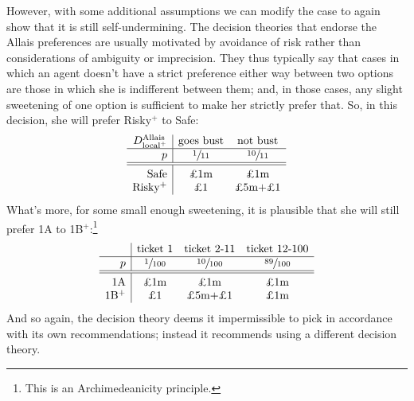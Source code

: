 \documentclass[a4paper]{article}
\newcommand\Tstrut{\rule{0pt}{2.6ex}}       %
\newcommand\Bstrut{\rule[-0.9ex]{0pt}{0pt}} %
\newenvironment{CCM rewritten}
{\begingroup\color{blue}} %
{\endgroup}              %
\begin{document}

However, with some additional assumptions we can modify the case to again show that it is still self-undermining. 
The decision theories that endorse the Allais preferences are usually motivated by avoidance of risk rather than considerations of ambiguity or imprecision. They thus typically say that cases in which an agent doesn't have a strict preference either way between two options are those in which  she is indifferent between them; and, in those cases, any slight sweetening of one option is sufficient to make her strictly prefer  that. %
So, in this decision, she will prefer Risky$^+$ to Safe:
$$
\begin{array}{r|cc}
 D^{\mathrm{Allais}}_{\mathrm{local}^+} & \text{goes bust} &  \text{not bust}  \Bstrut\\\hline
	p & \sfrac{1}{11} & \sfrac{10}{11}\Bstrut\\\hline\hline\Tstrut
	\text{Safe} &\text{\pounds 1m}&\text{\pounds 1m}                      \\
	\text{Risky$^+$} & \text{\pounds 1}&\text{\pounds 5m+\pounds 1}
\end{array}
$$ What's more, for some small enough sweetening, it is plausible that she will still prefer 1A to 1B$^+$:\footnote{This is an Archimedeanicity principle.}
$$
\begin{array}{r|cccc}
	& \text{ticket 1} &\text{ticket 2-11}& \text{ticket 12-100}\Bstrut\\\hline
	p & \sfrac{1}{100} & \sfrac{10}{100} & \sfrac{89}{100} \Bstrut\\\hline\hline\Tstrut
	\text{1A} & \text{\pounds 1m} & \text{\pounds 1m}  & \text{\pounds 1m} \\
	\text{1B$^+$} & \text{\pounds 1} & \text{\pounds 5m+\pounds1}  & \text{\pounds 1m}
\end{array}
$$
And so again, the decision theory deems it impermissible to pick in accordance with its own recommendations; instead it recommends using a different decision theory. 
\end{document}
